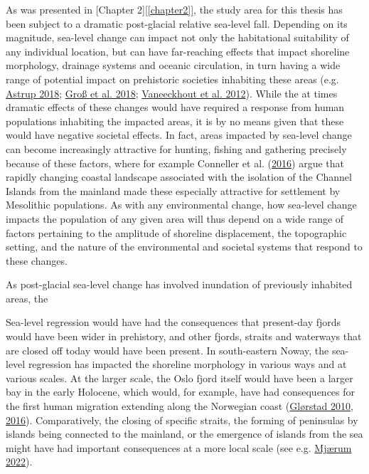 \documentclass[
  12pt,
  a4paper,
  oneside]{book}
\begin{document}
As was presented in {[}Chapter 2{]}{[}\ref{chapter2}{]}, the study area for this thesis has been subject to a dramatic post-glacial relative sea-level fall. Depending on its magnitude, sea-level change can impact not only the habitational suitability of any individual location, but can have far-reaching effects that impact shoreline morphology, drainage systems and oceanic circulation, in turn having a wide range of potential impact on prehistoric societies inhabiting these areas (e.g. \protect\hyperlink{ref-astrup2018}{Astrup 2018}; \protect\hyperlink{ref-gross2018}{Groß et al. 2018}; \protect\hyperlink{ref-vaneeckhout2012}{Vaneeckhout et al. 2012}). While the at times dramatic effects of these changes would have required a response from human populations inhabiting the impacted areas, it is by no means given that these would have negative societal effects. In fact, areas impacted by sea-level change can become increasingly attractive for hunting, fishing and gathering precisely because of these factors, where for example Conneller et al. (\protect\hyperlink{ref-conneller2016}{2016}) argue that rapidly changing coastal landscape associated with the isolation of the Channel Islands from the mainland made these especially attractive for settlement by Mesolithic populations. As with any environmental change, how sea-level change impacts the population of any given area will thus depend on a wide range of factors pertaining to the amplitude of shoreline displacement, the topographic setting, and the nature of the environmental and societal systems that respond to these changes.

As post-glacial sea-level change has involved inundation of previously inhabited areas, the

Sea-level regression would have had the consequences that present-day fjords would have been wider in prehistory, and other fjords, straits and waterways that are closed off today would have been present. In south-eastern Noway, the sea-level regression has impacted the shoreline morphology in various ways and at various scales. At the larger scale, the Oslo fjord itself would have been a larger bay in the early Holocene, which would, for example, have had consequences for the first human migration extending along the Norwegian coast (\protect\hyperlink{ref-glorstad2010}{Glørstad 2010}, \protect\hyperlink{ref-glorstad2016}{2016}). Comparatively, the closing of specific straits, the forming of peninsulas by islands being connected to the mainland, or the emergence of islands from the sea might have had important consequences at a more local scale (see e.g. \protect\hyperlink{ref-mjuxe6rum2022}{Mjærum 2022}).
\end{document}
